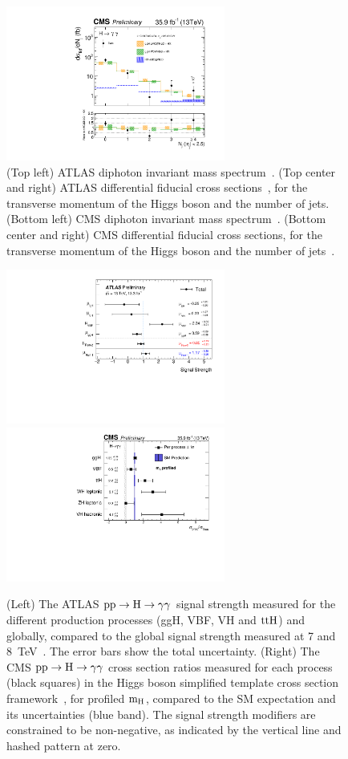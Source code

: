 \documentclass[10pt]{article}
\begin{document}
\begin{figure}[htb]
\includegraphics[height=2in]{figures/CMS-HIG-17-015__Figure_004-b__njets.pdf}
\caption{
  (Top left) ATLAS diphoton invariant mass spectrum~\cite{ATLAS-gg}.
  (Top center and right) ATLAS differential fiducial cross sections~\cite{ATLAS-gg}, for the
  transverse momentum of the Higgs boson and the number of jets.
  (Bottom left) CMS diphoton invariant mass spectrum~\cite{CMS:HIG-16-040}.
  (Bottom center and right) CMS differential fiducial cross sections, for the
  transverse momentum of the Higgs boson and the number of jets~\cite{CMS:HIG-17-015}.
}
\label{fig:figure-gg}
\end{figure}


\begin{figure}[htb]
\centering
\includegraphics[height=2in]{figures/ATLAS-CONF-2016-067__fig_14__mu.pdf}
\includegraphics[height=2in]{figures/CMS-HIG-16-040__Figure_017__mu.pdf}
\caption{
  (Left) The ATLAS ${\rm pp\to H\to \gamma\gamma}$ signal strength measured for
  the different production processes (ggH, VBF, VH and ${\rm ttH}$) and
  globally, compared to the global signal strength measured at 7 and 8~TeV~\cite{ATLAS-gg}.
  The error bars show the total uncertainty.
  (Right) The CMS ${\rm pp\to H\to \gamma\gamma}$ cross section ratios measured
  for each process (black squares) in the Higgs boson simplified template cross
  section framework~\cite{CMS:HIG-16-040}, for profiled ${\rm m_H}$, compared to
  the SM expectation and its uncertainties (blue band). The signal strength
  modifiers are constrained to be non-negative, as indicated by the vertical
  line and hashed pattern at zero.
}
\label{fig:figure-gg-2}
\end{figure}
\end{document}
